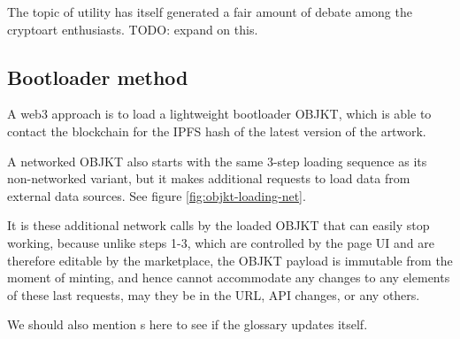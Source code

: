The topic of utility has itself generated a fair amount of debate among the cryptoart enthusiasts. TODO: expand on this.

\subsection{Bootloader method}

A web3 approach is to load a lightweight bootloader OBJKT, which is able to contact the blockchain for the IPFS hash of the latest version of the artwork.



A networked OBJKT also starts with the same 3-step loading sequence as its non-networked variant, but it makes additional requests to load data from external data sources. See figure \ref{fig:objkt-loading-net}.



It is these additional network calls by the loaded OBJKT that can easily stop working, because unlike steps 1-3, which are controlled by the page UI and are therefore editable by the marketplace, the OBJKT payload is immutable from the moment of minting, and hence cannot accommodate any changes to any elements of these last requests, may they be in the URL, API changes, or any others.

We should also mention s here to see if the glossary updates itself.


